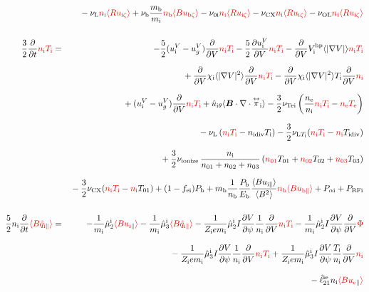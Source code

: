 \documentclass[11pt]{article}
\def\bvec#1{\leavevmode\hbox{\boldmath$#1$}}
\let\vec=\bvec
\def\r#1{{\rm#1}}
\def\aves#1{\langle#1\rangle}
\def\dd#1#2{\frac{\partial #1}{\partial #2}}
\def\tensor#1{\mathord{\displaystyle\mathop{#1}^\leftrightarrow}}
\def\para{\parallel}
\def\ddV{\frac{\partial}{\partial V}}
\def\mi{m_\r{i}}
\def\mb{m_\r{b}}
\def\nee{n_\r{e}}
\def\ni{n_\r{i}}
\def\nb{n_\r{b}}
\def\nna{n_{01}}
\def\nnb{n_{02}}
\def\nnc{n_{03}}
\def\Te{T_\r{e}}
\def\Ti{T_\r{i}}
\def\Zi{Z_\r{i}}
\def\Pb{P_\r{b}}
\def\Eb{E_\r{b}}
\def\uizt{u_{\r{i}\zeta}}
\def\ubzt{u_{\r{b}\zeta}}
\def\uepara{u_{\r{e}\para}}
\def\uipara{u_{\r{i}\para}}
\def\ubpara{u_{\r{b}\para}}
\def\qipara{q_{\r{i}\para}}
\def\qhatipara{\hat{q}_{\r{i}\para}}
\def\uiV{u_\r{i}^V}
\def\ugV{u_{g}^V}
\def\chii{\chi_\r{i}}
\def\ddt{\frac{\partial}{\partial t}}
\def\PRFi{P_\r{RFi}}
\def\Tna{T_{01}}
\def\Tnb{T_{02}}
\def\Tnc{T_{03}}
\def\fei{f_\r{ei}}
\def\Palpi{P_{\alpha\r{i}}}
\def\nuni{\nu_\r{0i}}
\def\nuL{\nu_\r{L}}
\def\nuCX{\nu_\r{CX}}
\def\nuion{\nu_\r{ionize}}
\def\nub{\nu_\r{b}}
\def\nidiv{n_\r{idiv}}
\def\Tidiv{T_\r{idiv}}
\def\nuLTi{\nu_{\r{L}T_\r{i}}}
\def\nuOL{\nu_\r{OL}}
\def\red#1{\textcolor{red}{#1}}
\begin{document}
\begin{eqnarray}
\nonumber\\[2.5mm]&&{}
%
  - \nuL  \red{\ni \aves{R \uizt}}
%
  + \nub  \frac{\mb}{\mi} \red{\nb \aves{B \ubzt}}
%
  - \nuni \red{\ni \aves{R \uizt}}
%
  - \nuCX \red{\ni \aves{R \uizt}}
%
  - \nuOL \red{\ni \aves{R \uizt}}
\\[5mm]
  \frac{3}{2} \ddt \red{\ni \Ti}  &=& 
%
  - \frac{5}{2} ( \uiV - \ugV ) \ddV \red{\ni \Ti}
%
  - \frac{5}{2} \dd{\uiV}{V} \red{\ni \Ti}
%
  - \ddV V_\r{i}^\r{hp} \aves{|\nabla V|} \red{\ni \Ti}
\nonumber\\[2.5mm]&&{}
  + \ddV \chii \aves{|\nabla V|^2} \ddV \red{\ni \Ti}
  - \ddV \chii \aves{|\nabla V|^2} \Ti \ddV \red{\ni}
\nonumber\\[2.5mm]&&{}
%
  + ( \uiV - \ugV ) \ddV \red{\ni \Ti}
%
  + \hat{u}_{\r{i}\theta} \aves{\vec{B}\cdot\nabla\cdot\tensor{\pi}_\r{i}}
%
  - \frac{3}{2} \nu_\r{Tei} \left(\frac{\nee}{\ni} \red{\ni \Ti} - \red{\nee \Te} \right)
\nonumber\\[2.5mm]&&{}
%
  - \nuL \left(\red{\ni \Ti}  - \nidiv \Ti \right)
%
  - \frac{3}{2} \nuLTi (\red{\ni \Ti} - \red{\ni} \Tidiv)
%
\nonumber\\[2.5mm]&&{}
  + \frac{3}{2} \nuion\, \frac{\ni}{\nna + \nnb + \nnc}\, (\red{\nna} \Tna +
  \red{\nnb} \Tnb + \red{\nnc} \Tnc)
\nonumber\\[2.5mm]&&{}
%
  - \frac{3}{2} \nuCX (\red{\ni \Ti} - \red{\ni} \Tna)
%
  + (1 - \fei) \Pb
%
  + \mb \frac{1}{\nb} \frac{\Pb}{\Eb} \frac{\aves{B
  \uipara}}{\aves{B^2}} \red{\nb \aves{B \ubpara}}
%
  + \Palpi
%
  + \PRFi
\\[5mm]
 \frac{5}{2} \ni \ddt \red{\aves{B \qhatipara}} &=&
%
  - \frac{1}{\mi} \hat{\mu}_2^\r{i} \red{\aves{B \uipara}}
  - \frac{1}{\mi} \hat{\mu}_3^\r{i} \red{\aves{B \qhatipara}}
%
  - \frac{1}{\Zi e\mi} \hat{\mu}_2^\r{i} I \dd{V}{\psi} \frac{1}{\ni}
  \ddV \red{\ni\Ti}
  - \frac{1}{\mi} \hat{\mu}_2^\r{i} I \dd{V}{\psi} \ddV \red{\Phi}
\nonumber\\[3mm]&&{}
%
  - \frac{1}{\Zi e\mi} \hat{\mu}_3^\r{i} I \dd{V}{\psi} \frac{1}{\ni}
  \ddV \red{\ni\Ti}
  + \frac{1}{\Zi e\mi} \hat{\mu}_3^\r{i} I \dd{V}{\psi} \frac{\Ti}{\ni}
  \ddV \red{\ni}
\nonumber\\[3mm]&&{}
%
  - \hat{\ell}_{21}^{\r{ie}} \ni \red{\aves{B \uepara}} 

\end{eqnarray}
\end{document}
